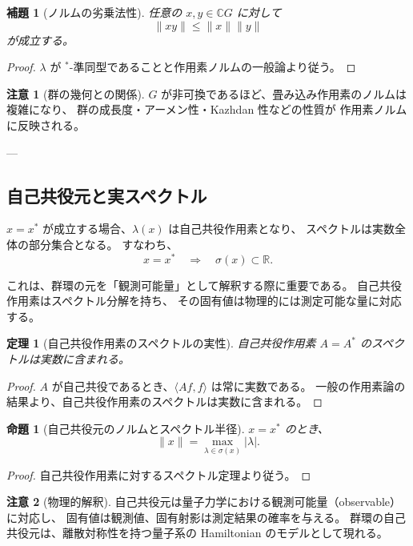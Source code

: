 \documentclass[12pt,a4paper]{ltjarticle}
\newtheorem*{theorem}{定理}
\newtheorem*{lemma}{補題}
\newtheorem*{proposition}{命題}
\theoremstyle{definition}
\newtheorem*{remark}{注意}
\begin{document}
\begin{lemma}[ノルムの劣乗法性]
任意の $x,y\in\mathbb{C}G$ に対して
\[
\|xy\|\le \|x\|\|y\|
\]
が成立する。
\end{lemma}

\begin{proof}
$\lambda$ が $^*$-準同型であることと作用素ノルムの一般論より従う。
\end{proof}

\begin{remark}[群の幾何との関係]
$G$ が非可換であるほど、畳み込み作用素のノルムは複雑になり、
群の成長度・アーメン性・Kazhdan 性などの性質が
作用素ノルムに反映される。
\end{remark}

---

\subsection{自己共役元と実スペクトル}

$x = x^*$ が成立する場合、$\lambda(x)$ は自己共役作用素となり、
スペクトルは実数全体の部分集合となる。
すなわち、
\[
x = x^* \quad \Rightarrow \quad \sigma(x) \subset \mathbb{R}.
\]

これは、群環の元を「観測可能量」として解釈する際に重要である。
自己共役作用素はスペクトル分解を持ち、
その固有値は物理的には測定可能な量に対応する。

\begin{theorem}[自己共役作用素のスペクトルの実性]
自己共役作用素 $A=A^*$ のスペクトルは実数に含まれる。
\end{theorem}

\begin{proof}
$A$ が自己共役であるとき、$\langle Af,f\rangle$ は常に実数である。
一般の作用素論の結果より、自己共役作用素のスペクトルは実数に含まれる。
\end{proof}

\begin{proposition}[自己共役元のノルムとスペクトル半径]
$x=x^*$ のとき、
\[
\|x\|=\max_{\lambda\in\sigma(x)}|\lambda|.
\]
\end{proposition}

\begin{proof}
自己共役作用素に対するスペクトル定理より従う。
\end{proof}

\begin{remark}[物理的解釈]
自己共役元は量子力学における観測可能量（observable）に対応し、
固有値は観測値、固有射影は測定結果の確率を与える。
群環の自己共役元は、離散対称性を持つ量子系の Hamiltonian のモデルとして現れる。
\end{remark}
\end{document}
